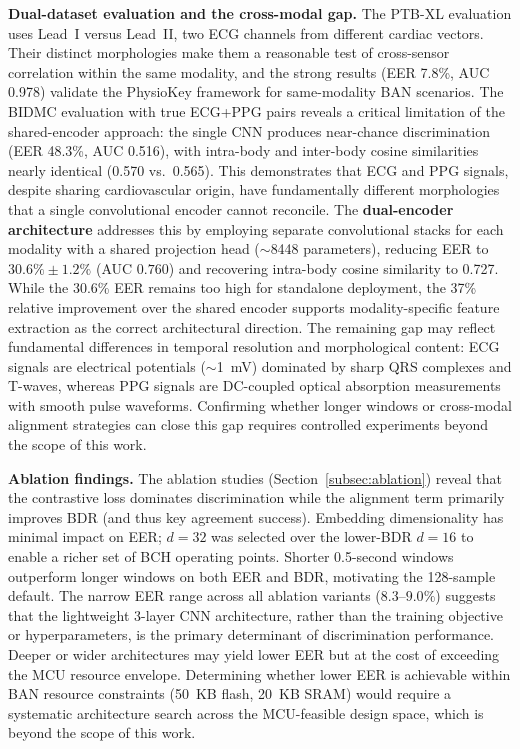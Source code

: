 \documentclass[sensors,article,submit,pdftex,moreauthors]{Definitions/mdpi}
\begin{document}
\textbf{Dual-dataset evaluation and the cross-modal gap.} The PTB-XL evaluation uses Lead~I versus Lead~II, two ECG channels from different cardiac vectors. Their distinct morphologies make them a reasonable test of cross-sensor correlation within the same modality, and the strong results (EER 7.8\%, AUC 0.978) validate the PhysioKey framework for same-modality BAN scenarios. The BIDMC evaluation with true ECG+PPG pairs reveals a critical limitation of the shared-encoder approach: the single CNN produces near-chance discrimination (EER 48.3\%, AUC 0.516), with intra-body and inter-body cosine similarities nearly identical (0.570 vs.\ 0.565). This demonstrates that ECG and PPG signals, despite sharing cardiovascular origin, have fundamentally different morphologies that a single convolutional encoder cannot reconcile. The \textbf{dual-encoder architecture} addresses this by employing separate convolutional stacks for each modality with a shared projection head ($\sim$8448 parameters), reducing EER to $30.6\% \pm 1.2\%$ (AUC $0.760$) and recovering intra-body cosine similarity to 0.727. While the 30.6\% EER remains too high for standalone deployment, the 37\% relative improvement over the shared encoder supports modality-specific feature extraction as the correct architectural direction. The remaining gap may reflect fundamental differences in temporal resolution and morphological content: ECG signals are electrical potentials ($\sim$1~mV) dominated by sharp QRS complexes and T-waves, whereas PPG signals are DC-coupled optical absorption measurements with smooth pulse waveforms. Confirming whether longer windows or cross-modal alignment strategies can close this gap requires controlled experiments beyond the scope of this work.

\textbf{Ablation findings.} The ablation studies (Section~\ref{subsec:ablation}) reveal that the contrastive loss dominates discrimination while the alignment term primarily improves BDR (and thus key agreement success). Embedding dimensionality has minimal impact on EER; $d = 32$ was selected over the lower-BDR $d = 16$ to enable a richer set of BCH operating points. Shorter 0.5-second windows outperform longer windows on both EER and BDR, motivating the 128-sample default. The narrow EER range across all ablation variants ($8.3$--$9.0\%$) suggests that the lightweight 3-layer CNN architecture, rather than the training objective or hyperparameters, is the primary determinant of discrimination performance. Deeper or wider architectures may yield lower EER but at the cost of exceeding the MCU resource envelope. Determining whether lower EER is achievable within BAN resource constraints (50~KB flash, 20~KB SRAM) would require a systematic architecture search across the MCU-feasible design space, which is beyond the scope of this work.
\end{document}
